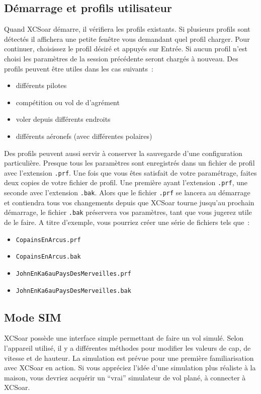 \subsection*{Démarrage et profils utilisateur}\label{sec:profiles}
Quand XCSoar démarre, il vérifiera les profils existants. Si plusieurs
profils sont détectés il affichera une petite fenêtre vous demandant quel profil
charger. Pour continuer, choisissez le profil désiré et appuyés sur Entrée. Si aucun
profil n'est choisi les paramètres de la session précédente seront chargés à nouveau. Des profils
peuvent être utiles dans les cas suivants~:
\begin{itemize}
\item différents pilotes
\item compétition ou vol de d'agrément
\item voler depuis différents endroits
\item différents aéronefs (avec différentes polaires)
\end{itemize}
Des profils peuvent aussi servir à conserver la sauvegarde d'une
configuration particulière. Presque tous les paramètres sont enregistrés dans un fichier
de profil avec l'extension \texttt{.prf}. Une fois que vous êtes satisfait de votre paramétrage,
faites deux copies de votre fichier de profil. Une première ayant l'extension \texttt{.prf}, 
une seconde avec l'extension \texttt{.bak}.
Alors que le fichier \texttt{.prf} se lancera au démarrage et contiendra tous 
vos changements depuis que XCSoar tourne jusqu'au prochain démarrage, le fichier
\texttt{.bak} préservera vos paramètres, tant que vous jugerez utile de le faire.
A titre d'exemple, vous pourriez créer une série de fichiers tels que~:
\begin{itemize}
\item \texttt{CopainsEnArcus.prf}
\item \texttt{CopainsEnArcus.bak}
\item \texttt{JohnEnKa6auPaysDesMerveilles.prf}
\item \texttt{JohnEnKa6auPaysDesMerveilles.bak}
\end{itemize}

\subsection*{Mode SIM}
XCSoar possède une interface simple permettant de faire un vol
simulé. Selon l'appareil utilisé, il y a différentes
méthodes pour modifier les valeurs de cap, de vitesse et de hauteur. La simulation est
prévue pour une première familiarisation avec XCSoar en action. Si vous appréciez
l'idée d'une simulation plus réaliste à la maison, vous devriez acquérir un ``vrai''
simulateur de vol plané, à connecter à XCSoar.

